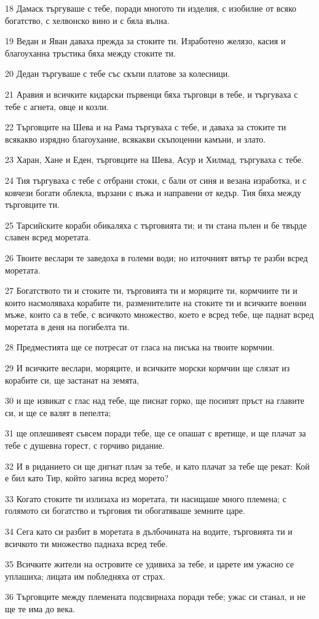 \par 18 Дамаск търгуваше с тебе, поради многото ти изделия, с изобилие от всяко богатство, с хелвонско вино и с бяла вълна.
\par 19 Ведан и Яван даваха прежда за стоките ти. Изработено желязо, касия и благоуханна тръстика бяха между стоките ти.
\par 20 Дедан търгуваше с тебе със скъпи платове за колесници.
\par 21 Аравия и всичките кидарски първенци бяха търговци в тебе, и търгуваха с тебе с агнета, овце и козли.
\par 22 Търговците на Шева и на Рама търгуваха с тебе, и даваха за стоките ти всякакво изрядно благоухание, всякакви скъпоценни камъни, и злато.
\par 23 Харан, Хане и Еден, търговците на Шева, Асур и Хилмад, търгуваха с тебе.
\par 24 Тия търгуваха с тебе с отбрани стоки, с бали от синя и везана изработка, и с ковчези богати облекла, вързани с въжа и направени от кедър. Тия бяха между търговците ти.
\par 25 Тарсийските кораби обикаляха с търговията ти; и ти стана пълен и бе твърде славен всред моретата.
\par 26 Твоите веслари те заведоха в големи води; но източният вятър те разби всред моретата.
\par 27 Богатството ти и стоките ти, търговията ти и моряците ти, кормчиите ти и които насмоляваха корабите ти, разменителите на стоките ти и всичките военни мъже, които са в тебе, с всичкото множество, което е всред тебе, ще паднат всред моретата в деня на погибелта ти.
\par 28 Предместията ще се потресат от гласа на писъка на твоите кормчии.
\par 29 И всичките веслари, моряците, и всичките морски кормчии ще слязат из корабите си, ще застанат на земята,
\par 30 и ще извикат с глас над тебе, ще писнат горко, ще посипят пръст на главите си, и ще се валят в пепелта;
\par 31 ще оплешивеят съвсем поради тебе, ще се опашат с вретище, и ще плачат за тебе с душевна горест, с горчиво ридание.
\par 32 И в риданието си ще дигнат плач за тебе, и като плачат за тебе ще рекат: Кой е бил като Тир, който загина всред морето?
\par 33 Когато стоките ти излизаха из моретата, ти насищаше много племена; с голямото си богатство и търговия ти обогатяваше земните царе.
\par 34 Сега като си разбит в моретата в дълбочината на водите, търговията ти и всичкото ти множество паднаха всред тебе.
\par 35 Всичките жители на островите се удивиха за тебе, и царете им ужасно се уплашиха; лицата им побледняха от страх.
\par 36 Търговците между племената подсвирнаха поради тебе; ужас си станал, и не ще те има до века.


